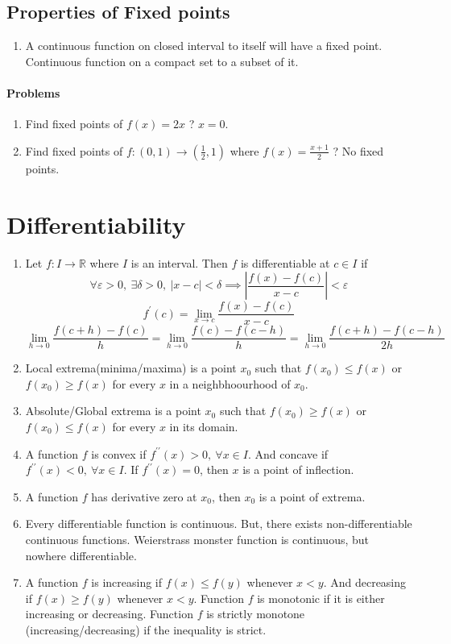 \subsection{Properties of Fixed points}
\begin{enumerate}
	\item A continuous function on closed interval to itself will have a fixed point.
		\subitem Continuous function on a compact set to a subset of it.
\end{enumerate}

\paragraph{Problems}
\begin{enumerate}
	\item Find fixed points of $f(x) =2x$ ? $x = 0$.
	\item Find fixed points of $f : (0,1) \to (\frac{1}{2}, 1)$ where $f(x) = \frac{x+1}{2}$ ? No fixed points.
\end{enumerate}

\section{Differentiability}
\begin{enumerate}
	\item Let $f : I \to \mathbb{R}$ where $I$ is an interval. Then $f$ is differentiable at $c \in I$ if
		$$ \forall \varepsilon > 0,\ \exists \delta > 0,\ |x-c| < \delta \implies \left| \frac{f(x)-f(c)}{x-c} \right| < \varepsilon $$
		$$ f^\prime(c) = \lim_{x \to c} \frac{f(x)-f(c)}{x-c} $$
		$$ \lim_{h \to 0} \frac{f(c+h)-f(c)}{h} = \lim_{h \to 0} \frac{f(c)-f(c-h)}{h} = \lim_{h \to 0} \frac{f(c+h)-f(c-h)}{2h} $$
	\item Local extrema(minima/maxima) is a point $x_0$ such that $f(x_0) \le f(x)$ or $f(x_0) \ge f(x)$ for every $x$ in a neighbhoourhood of $x_0$.
	\item Absolute/Global extrema is a point $x_0$ such that $f(x_0) \ge f(x)$ or $f(x_0) \le f(x)$ for every $x$ in its domain.
	\item A function $f$ is convex if $f^{\prime\prime}(x) > 0,\ \forall x \in I$. And concave if $f^{\prime\prime}(x) < 0,\ \forall x \in I$. If $f^{\prime\prime}(x) = 0$, then $x$ is a point of inflection.
	\item A function $f$ has derivative zero at $x_0$, then $x_0$ is a point of extrema.
	\item Every differentiable function is continuous. But, there exists non-differentiable continuous functions. 
		\subitem Weierstrass monster function is continuous, but nowhere differentiable.
	\item A function $f$ is increasing if $f(x)\le f(y)$ whenever $x<y$. And decreasing if $f(x) \ge f(y)$ whenever $x<y$. Function $f$ is monotonic if it is either increasing or decreasing. Function $f$ is strictly monotone (increasing/decreasing) if the inequality is strict.
\end{enumerate}
